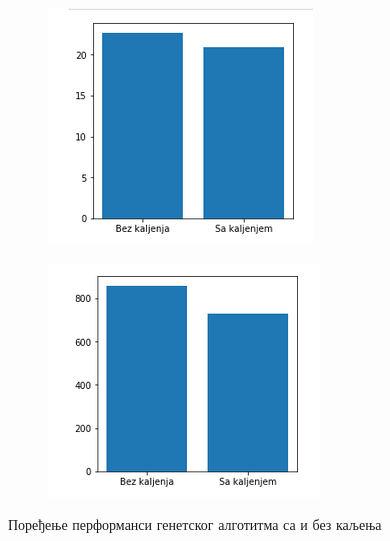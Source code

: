 \documentclass[a4paper]{article}
\begin{document}
{\begin{figure}[h!]
	\centering
	\begin{subfigure}{.4\textwidth}
		\centering
		\includegraphics[width=\linewidth]{images/time_compare.png}
	\end{subfigure}
	\begin{subfigure}{.4\textwidth}
		\centering
		\includegraphics[width=\linewidth]{images/iters_compare.png}
	\end{subfigure}
	\caption{Поређење перформанси генетског алготитма са и без каљења}
	\label{performance_comp}
\end{figure}

}
\end{document}
